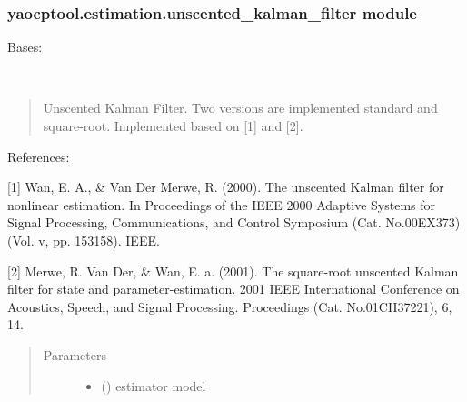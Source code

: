 \documentclass[letterpaper,10pt,english]{sphinxmanual}
\begin{document}
\subsubsection{yaocptool.estimation.unscented\_kalman\_filter module}
\label{\detokenize{yaocptool.estimation:module-yaocptool.estimation.unscented_kalman_filter}}\label{\detokenize{yaocptool.estimation:yaocptool-estimation-unscented-kalman-filter-module}}

\begin{fulllineitems}
\label{\detokenize{yaocptool.estimation:yaocptool.estimation.unscented_kalman_filter.UnscentedKalmanFilter}}
Bases: {\hyperref[\detokenize{yaocptool.estimation:yaocptool.estimation.estimator_abstract.EstimatorAbstract}]{}}

\begin{fulllineitems}
\label{\detokenize{yaocptool.estimation:yaocptool.estimation.unscented_kalman_filter.UnscentedKalmanFilter.__init__}}~\begin{quote}

Unscented Kalman Filter. Two versions are implemented standard and square-root.
Implemented based on {[}1{]} and {[}2{]}.
\end{quote}

References:

{[}1{]} Wan, E. A., \& Van Der Merwe, R. (2000). The unscented Kalman filter for nonlinear estimation.
In Proceedings of the IEEE 2000 Adaptive Systems for Signal Processing, Communications, and Control Symposium
(Cat. No.00EX373) (Vol. v, pp. 153\textendash{}158). IEEE. 

{[}2{]} Merwe, R. Van Der, \& Wan, E. a. (2001). The square-root unscented Kalman filter for state and
parameter-estimation. 2001 IEEE International Conference on Acoustics, Speech, and Signal Processing.
Proceedings (Cat. No.01CH37221), 6, 1\textendash{}4. 
\begin{quote}\begin{description}
\item[{Parameters}] \leavevmode\begin{itemize}
\item {} 
 ({\hyperref[\detokenize{yaocptool.modelling:yaocptool.modelling.system_model.SystemModel}]{}}) \textendash{} estimator model


\end{itemize}
\end{description}
\end{quote}
\end{fulllineitems}
\end{fulllineitems}
\end{document}
